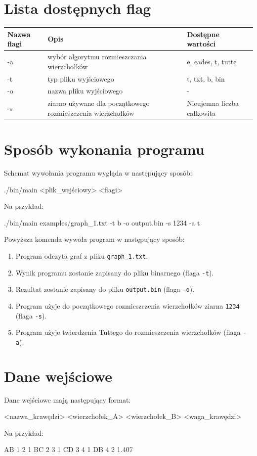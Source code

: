 \documentclass[]{article}
\begin{document}
	\section{Lista dostępnych flag}
	\begin{tabularx}{\textwidth}{| X | X | X |}
		\hline
		Nazwa flagi & Opis & Dostępne wartości\\
		\hline
		-a & wybór algorytmu rozmieszczania wierzchołków & e, eades, t, tutte\\
		\hline
		-t & typ pliku wyjściowego & t, txt, b, bin\\
		\hline
		-o & nazwa pliku wyjściowego & -\\
		\hline
		-s & ziarno używane dla początkowego rozmieszczenia wierzchołków & Nieujemna liczba całkowita \\
		\hline
	\end{tabularx}
	\section{Sposób wykonania programu}
	Schemat wywołania programu wygląda w następujący sposób:
	\begin{mylisting}
./bin/main <plik_wejściowy> <flagi>
	\end{mylisting}
	Na przykład:
	\begin{mylisting}
./bin/main examples/graph_1.txt -t b -o output.bin -s 1234 -a t
	\end{mylisting}
	Powyższa komenda wywoła program w następujący sposób:
	\begin{enumerate}
		\item Program odczyta graf z pliku \texttt{graph\_1.txt}.
		\item Wynik programu zostanie zapisany do pliku binarnego (flaga \texttt{-t}).
		\item Rezultat zostanie zapisany do pliku \texttt{output.bin} (flaga \texttt{-o}).
		\item Program użyje do początkowego rozmieszczenia wierzchołków ziarna \texttt{1234} (flaga \texttt{-s}).
		\item Program użyje twierdzenia Tuttego do rozmieszczenia wierzchołków (flaga \texttt{-a}).
	\end{enumerate}
	\section{Dane wejściowe}
	Dane wejściowe mają następujący format:
	\begin{mylisting}
<nazwa_krawędzi> <wierzchołek_A> <wierzchołek_B> <waga_krawędzi>	
	\end{mylisting}
	Na przykład:
	\begin{mylisting}
AB   1  2  1
BC   2  3  1
CD   3  4  1
DB   4  2  1.407
	\end{mylisting}
\end{document}
